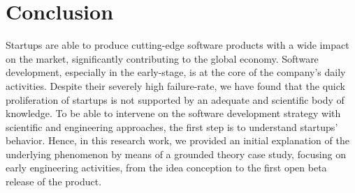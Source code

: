 \documentclass[10pt,journal,letterpaper,compsoc]{IEEEtran}
\begin{document}
%





\section{Conclusion}
\label{conc}
Startups are able to produce cutting-edge software products with a wide impact 
on the market, significantly contributing to the global economy. Software 
development, especially in the early-stage, is at the core of the company's 
daily activities. Despite their severely high failure-rate, we have found that 
the quick proliferation of startups is not supported by an adequate and 
scientific body of knowledge. %
To be able to intervene on the software development strategy with scientific and 
engineering approaches, the first step is to understand startups' behavior. 
Hence, in this research work, we provided an initial explanation of the 
underlying phenomenon by means of a grounded theory case study, focusing on 
early engineering activities, from the idea conception to the first open beta 
release of the product.
\end{document}
